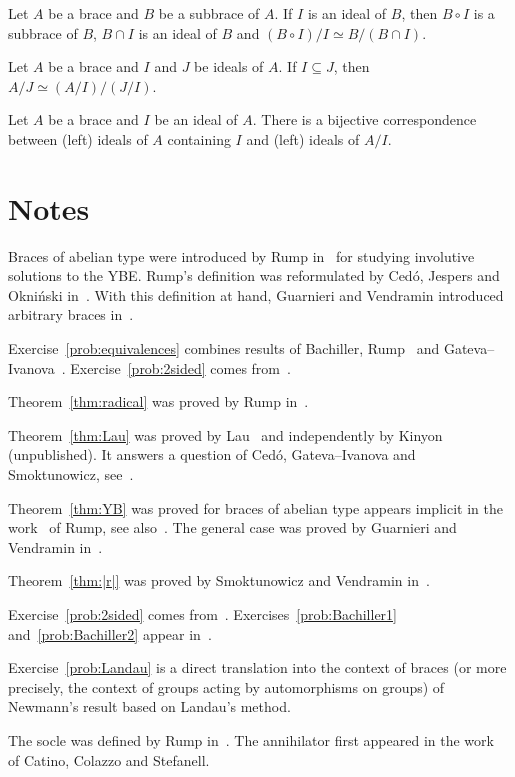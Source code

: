 \begin{prob}
\label{prob:iso2}
    Let $A$ be a brace and $B$ be a subbrace of $A$. If $I$ is an ideal of $B$, 
    then $B\circ I$ is a subbrace of $B$, 
    $B\cap I$ is an ideal of $B$ and $(B\circ I)/I\simeq B/(B\cap I)$. 
\end{prob}

\begin{prob}
\label{prob:iso3}
Let $A$ be a brace and $I$ and $J$ be ideals of $A$. If $I\subseteq J$, then
$A/J\simeq (A/I)/(J/I)$. 
\end{prob}

\begin{prob}
\label{prob:correspondence}
Let $A$ be a brace and $I$ be an ideal of $A$. There is a bijective correspondence between (left) ideals 
of $A$ containing $I$ and (left) ideals of $A/I$. 
\end{prob}
\section*{Notes}

Braces of abelian type were introduced by Rump in~\cite{MR2278047} for studying involutive
solutions to the YBE. 
Rump's definition was reformulated  
by Ced\'o, Jespers and Okni\'nski in~\cite{MR3177933}. With this definition at hand, 
Guarnieri and Vendramin introduced 
arbitrary braces in~\cite{MR3647970}. 

Exercise~\ref{prob:equivalences} combines results of Bachiller, Rump~\cite{MR2278047} and
Gateva--Ivanova~\cite{MR3861714}. Exercise~\ref{prob:2sided} comes from~\cite{MR3177933}. 

Theorem~\ref{thm:radical} was proved by Rump in~\cite{MR2278047}. 

Theorem~\ref{thm:Lau} was proved by Lau~\cite{MR4136750} and independently by Kinyon (unpublished). It answers 
a question of Ced\'o, Gateva--Ivanova and Smoktunowicz, see~\cite{MR3818285}. 

Theorem~\ref{thm:YB} was proved for braces of abelian type appears implicit in the work~\cite{MR2278047} of Rump, see
also~\cite{MR3177933}. The general case was proved by Guarnieri and Vendramin in~\cite{MR3647970}. 

Theorem~\ref{thm:|r|} was proved by Smoktunowicz and Vendramin in~\cite{MR3763907}. 

Exercise~\ref{prob:2sided} comes from~\cite{MR3177933}. 
Exercises~\ref{prob:Bachiller1} and~\ref{prob:Bachiller2} appear in~\cite{MR3835326}.

Exercise~\ref{prob:Landau} is a direct translation into the context of braces 
(or more precisely, the context of groups acting by automorphisms on groups)   
of Newmann's result based on Landau's method. 

The socle was defined by Rump in~\cite{MR2278047}. The annihilator first appeared in the work~\cite{MR3917122}  
of Catino, Colazzo and Stefanell. 
